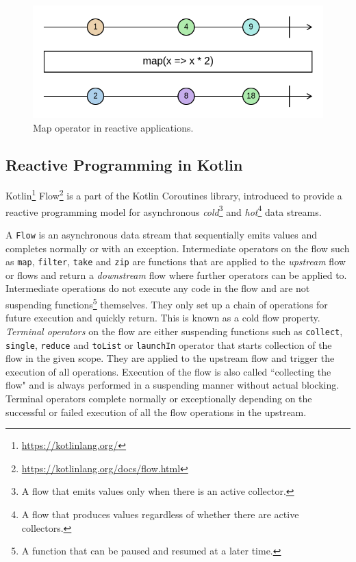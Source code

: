 \begin{figure}
    \centering
    \includegraphics[width=\linewidth]{figures/map-marble.png}
    \caption{Map operator in reactive applications.}
    \label{fig:reactive-map}
\end{figure}

\subsection{Reactive Programming in Kotlin}

Kotlin\footnote{\url{https://kotlinlang.org/}} Flow\footnote{\url{https://kotlinlang.org/docs/flow.html}} is a part of the Kotlin Coroutines library, introduced to provide a reactive programming model for asynchronous \textit{cold}\footnote{A flow that emits values only when there is an active collector.} and \textit{hot}\footnote{A flow that produces values regardless of whether there are active collectors.} data streams.

A \texttt{Flow} is an asynchronous data stream that sequentially emits values and completes normally or with an exception. Intermediate operators on the flow such as \texttt{map}, \texttt{filter}, \texttt{take} and \texttt{zip} are functions that are applied to the \textit{upstream} flow or flows and return a \textit{downstream} flow where further operators can be applied to. Intermediate operations do not execute any code in the flow and are not suspending functions\footnote{A function that can be paused and resumed at a later time.} themselves. They only set up a chain of operations for future execution and quickly return. This is known as a cold flow property. \textit{Terminal operators} on the flow are either suspending functions such as \texttt{collect}, \texttt{single}, \texttt{reduce} and \texttt{toList} or \texttt{launchIn} operator that starts collection of the flow in the given scope. They are applied to the upstream flow and trigger the execution of all operations. Execution of the flow is also called ``collecting the flow" and is always performed in a suspending manner without actual blocking. Terminal operators complete normally or exceptionally depending on the successful or failed execution of all the flow operations in the upstream.

